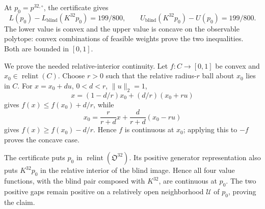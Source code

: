 At \(p_0=p^{32,\circ}\), the certificate gives
\[
L(p_0)-L_{\mathrm{blind}}(K^{32}p_0)=199/800,\qquad
U_{\mathrm{blind}}(K^{32}p_0)-U(p_0)=199/800.
\]
The lower value is convex and the upper value is concave on the observable polytope: convex combinations of feasible weights prove the two inequalities.  Both are bounded in \([0,1]\).

We prove the needed relative-interior continuity.  Let \(f:C\to[0,1]\) be convex and \(x_0\in\operatorname{relint}(C)\).  Choose \(r>0\) such that the relative radius-\(r\) ball about \(x_0\) lies in \(C\).  For \(x=x_0+du\), \(0<d<r\), \(\|u\|_2=1\),
\[
x=(1-d/r)x_0+(d/r)(x_0+ru)
\]
gives \(f(x)\leq f(x_0)+d/r\), while
\[
x_0=\frac r{r+d}x+\frac d{r+d}(x_0-ru)
\]
gives \(f(x)\geq f(x_0)-d/r\).  Hence \(f\) is continuous at \(x_0\); applying this to \(-f\) proves the concave case.

The certificate puts \(p_0\) in \(\operatorname{relint}(\mathfrak O^{32})\).  Its positive generator representation also puts \(K^{32}p_0\) in the relative interior of the blind image.  Hence all four value functions, with the blind pair composed with \(K^{32}\), are continuous at \(p_0\).  The two positive gaps remain positive on a relatively open neighborhood \(\mathcal U\) of \(p_0\), proving the claim.